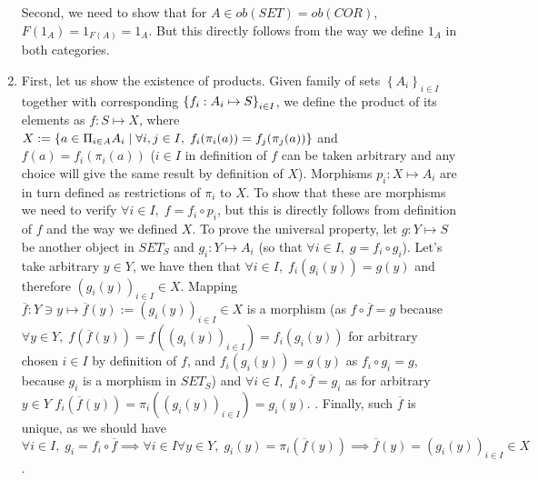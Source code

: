 \documentclass[8pt]{article} %
\begin{document}
\begin{enumerate}[label=\bfseries Problem \arabic*.]
{\begin{enumerate}[label=(\arabic*).]
{				Second, we need to show that for $A\in ob(SET)=ob(COR)$, $F(1_A)=1_{F(A)}=1_A$. But this directly follows
				from the way we define $1_A$ in both categories.
				}
		\end{enumerate}
		}
	\item{First, let us show the existence of products. Given family of sets $\left\{A_i\right\}_{i\in I}$ 
		together with corresponding $\left\{f_i:A_i\mapsto S\right\}_{i\in I}$, we define
		the product of its elements as $f:S\mapsto X$,
		where $X:=\left\{a\in\Pi_{i\in A}A_i\mid \forall i,j\in I,\;f_i(\pi_i(a))=f_j(\pi_j(a))\right\}$ and
		$f(a)=f_i(\pi_i(a))$ ($i\in I$ in definition of $f$ can be taken arbitrary and any choice will
		give the same result by definition of $X$).
		Morphisms $p_i:X\mapsto A_i$ are in turn defined as restrictions of $\pi_i$ to $X$. To show that these
		are morphisms we need to verify $\forall i\in I,\;f=f_i\circ p_i$, but this is directly follows from definition
		of $f$ and the way we defined $X$. To prove the universal property, let $g:Y\mapsto S$ be another object in $SET_S$
		and $g_i:Y\mapsto A_i$ (so that $\forall i\in I,\;g=f_i\circ g_i$). Let's take arbitrary $y\in Y$, we have then that
		$\forall i\in I,\;f_i(g_i(y))=g(y)$ and therefore $\left(g_i(y)\right)_{i\in I}\in X$. Mapping $\overline{f}:Y\ni y
		\mapsto \overline{f}(y):=\left(g_i(y)\right)_{i\in I}\in X$ is a morphism (as $f\circ\overline{f}=g$ because
		$\forall y\in Y,\;f(\overline{f}(y))=f\left(\left(g_i(y)\right)_{i\in I}\right)=f_i(g_i(y))$ 
		for arbitrary chosen $i\in I$ by definition of $f$, and $f_i(g_i(y))=g(y)$ as $f_i\circ g_i=g$, because $g_i$ is a
		morphism in $SET_S$) and $\forall i\in I,\;f_i\circ\overline{f}=g_i$ as for arbitrary $y\in Y$ $f_i(\overline{f}(y))=
		\pi_i\left(\left(g_i(y)\right)_{i\in I}\right)=g_i(y)$.
		. Finally, such $\overline{f}$ is unique, as we should have $\forall i\in I,\;g_i=f_i\circ\overline{f}\implies
		\forall i\in I\forall y\in Y,\;g_i(y)=\pi_i(\overline{f}(y))\implies \overline{f}(y)=\left(g_i(y)\right)_{i\in I}
		\in X$.

}
\end{enumerate}
\end{document}
